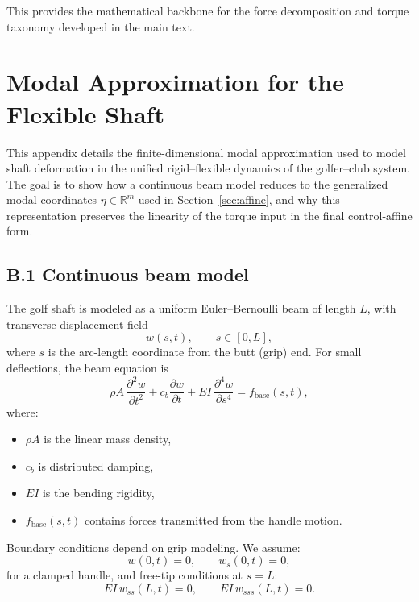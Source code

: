 \documentclass[12pt]{article}
\begin{document}
This provides the mathematical backbone for the force decomposition and torque taxonomy developed in the main text.

\section{Modal Approximation for the Flexible Shaft}
\label{app:modal}

This appendix details the finite-dimensional modal approximation used to model shaft deformation in the unified rigid--flexible dynamics of the golfer--club system. The goal is to show how a continuous beam model reduces to the generalized modal coordinates \(\eta \in \mathbb{R}^{m}\) used in Section~\ref{sec:affine}, and why this representation preserves the linearity of the torque input in the final control-affine form.

\subsection{B.1 \quad Continuous beam model}

The golf shaft is modeled as a uniform Euler--Bernoulli beam of length \(L\), with transverse displacement field
\[
  w(s,t), \qquad s \in [0,L],
\]
where \(s\) is the arc-length coordinate from the butt (grip) end. For small deflections, the beam equation is
\begin{equation}
  \rho A \,\frac{\partial^2 w}{\partial t^2}
  + c_b \frac{\partial w}{\partial t}
  + EI \,\frac{\partial^4 w}{\partial s^4}
  = f_{\mathrm{base}}(s,t),
  \label{eq:beam_equation}
\end{equation}
where:
\begin{itemize}
  \item \(\rho A\) is the linear mass density,
  \item \(c_b\) is distributed damping,
  \item \(E I\) is the bending rigidity,
  \item \(f_{\mathrm{base}}(s,t)\) contains forces transmitted from the handle motion.
\end{itemize}

Boundary conditions depend on grip modeling. We assume:
\[
  w(0,t) = 0, \qquad w_s(0,t) = 0,
\]
for a clamped handle, and free-tip conditions at \(s=L\):
\[
  EI\,w_{ss}(L,t) = 0, \qquad EI\,w_{sss}(L,t) = 0.
\]
\end{document}

